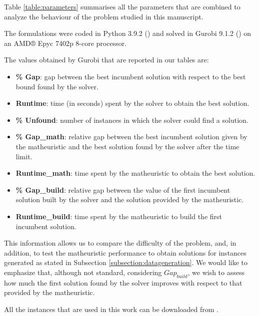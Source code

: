 \documentclass[a4paper,  review, authoryear, 1p.]{elsarticle}
\newcommand{\JP}[1]{{\color{blue}#1}}
\newcommand{\CV}[1]{{\color{blue}#1}}
\begin{document}
		\CV{Table \ref{table:parameters} summarises all the parameters that are combined to analyze the behaviour of the problem studied in this manuscript.}
		
		

		The formulations were coded in Python 3.9.2 (\citet{g.vanrossumguido1995}) and solved in Gurobi 9.1.2 (\citet{gurobioptimizationllc2022a}) on an AMD® Epyc 7402p 8-core processor. 
		
		\CV{
		The values obtained by Gurobi that are reported in our tables are:
		\begin{itemize}
			\item \textbf{\% Gap}: gap between the best incumbent solution with respect to the best bound found by the solver.
			\item \textbf{Runtime}: time (in seconds) spent by the solver to obtain the best solution.
			\item \textbf{\% Unfound}: number of instances in which the solver could find a solution.
			\item \textbf{\% Gap\_{math}}: relative gap between the best incumbent solution given by the matheuristic and the best solution found by the solver after the time limit.
			\item \textbf{Runtime\_{math}}: time spent by the matheuristic to obtain the best solution.
			\item \textbf{\% Gap\_{build}}: relative gap between the value of the first incumbent solution built by the solver and the solution provided by the matheuristic.
			\item \textbf{Runtime\_{build}}: time spent by the matheuristic to build the first incumbent solution.
		\end{itemize}
		
		This information allows us to compare the difficulty of the problem, and, in addition, to test the matheuristic performance to obtain solutions for instances generated as stated in Subsection \ref{subsection:datageneration}. \JP{We would like to emphasize that, although not standard,  considering $Gap_{build}$, we wish to assess  how much the first solution found by the solver improves with respect to that provided by the matheuristic.}}
		
		\CV{All the instances that are used in this work can be downloaded from \cite{valverde2023}.}
			 
\end{document}
